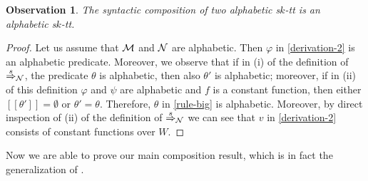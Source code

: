 \documentclass[10pt]{scrartcl}
\newtheorem{ob}[df]{Observation}
\newcommand{\seml}{[\![}
\newcommand{\semr}{]\!]}
\begin{document}
\begin{ob}\rm \label{ob:alph-stt} The syntactic composition of two
  alphabetic s$k$-tt is an alphabetic s$k$-tt.
\end{ob}
\begin{proof} Let us assume that ${\cal M}$ and ${\cal N}$ are
alphabetic. Then $\varphi$ in \eqref{derivation-2} is an alphabetic
predicate. Moreover, we observe that if in (i) of the definition of
$\stackrel{s}{\Rightarrow}_{\cal N}$, the predicate $\theta$ is alphabetic, then also
$\theta'$ is alphabetic; moreover, if  in (ii) of this definition 
$\varphi$ and $\psi$ are
alphabetic and $f$ is a constant function, then either $\seml \theta'
\semr = \emptyset$ or $\theta' = \theta$. Therefore, $\theta$ in
\eqref{rule-big} is alphabetic. Moreover, by direct inspection of (ii)
of the definition of $\stackrel{s}{\Rightarrow}_{\cal N}$ we can see
that $v$ in \eqref{derivation-2} consists of constant functions over
$W$. 
\end{proof}

Now we are able to prove our main composition result, which is in fact the generalization of \cite[Thm. 1]{bak79}.
\end{document}
